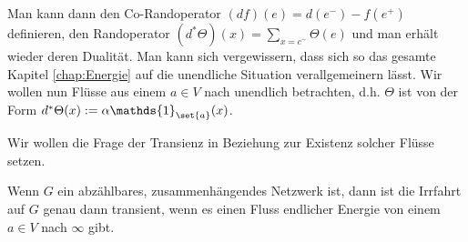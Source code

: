 Man kann dann den Co-Randoperator $(df)(e)= d(e^-) - f(e^+)$ definieren, den Randoperator $(d^*\Theta)(x) = \sum\limits_{x = c^-}\Theta(e)$ und man erhält wieder deren Dualität. Man kann sich vergewissern, dass sich so das gesamte Kapitel \ref{chap:Energie} auf die unendliche Situation verallgemeinern lässt. Wir wollen nun Flüsse aus einem $a \in V$ nach unendlich betrachten, d.h. $\Theta$ ist von der Form $d^*\Theta(x) := \alpha \mathds{1}_{\set{a}}(x)$. 

Wir wollen die Frage der Transienz in Beziehung zur Existenz solcher Flüsse setzen.

\begin{satz}[Lyons]
	Wenn $G$ ein abzählbares, zusammenhängendes Netzwerk ist, dann ist die Irrfahrt auf $G$ genau dann transient, wenn es einen Fluss endlicher Energie von einem $a \in V$ nach $\infty$ gibt.
\end{satz}
